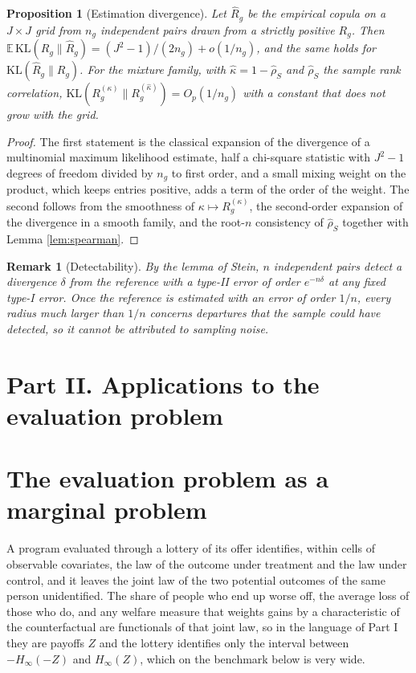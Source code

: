 \documentclass[11pt,a4paper]{article}
\theoremstyle{notesplain}
\newtheorem{proposition}[theorem]{Proposition}
\theoremstyle{notesupright}
\newtheorem{remark}[theorem]{Remark}
\numberwithin{equation}{section}
\newcommand{\KL}{\mathrm{KL}}
\newcommand{\E}{\mathbb{E}}
\begin{document}
\begin{proposition}[Estimation divergence]
\label{prop:estimation}
Let $\hat R_g$ be the empirical copula on a $J\times J$ grid from $n_g$ independent pairs drawn from a strictly positive $R_g$. Then $\E\,\KL(R_g\|\hat R_g)=(J^2-1)/(2n_g)+o(1/n_g)$, and the same holds for $\KL(\hat R_g\|R_g)$. For the mixture family, with $\hat\kappa=1-\hat\rho_S$ and $\hat\rho_S$ the sample rank correlation, $\KL(R^{(\kappa)}_g\|R^{(\hat\kappa)}_g)=O_p(1/n_g)$ with a constant that does not grow with the grid.
\end{proposition}

\begin{proof}
The first statement is the classical expansion of the divergence of a multinomial maximum likelihood estimate, half a chi-square statistic with $J^2-1$ degrees of freedom divided by $n_g$ to first order, and a small mixing weight on the product, which keeps entries positive, adds a term of the order of the weight. The second follows from the smoothness of $\kappa\mapsto R^{(\kappa)}_g$, the second-order expansion of the divergence in a smooth family, and the root-$n$ consistency of $\hat\rho_S$ together with Lemma \ref{lem:spearman}.
\end{proof}

\begin{remark}[Detectability]
By the lemma of Stein, $n$ independent pairs detect a divergence $\delta$ from the reference with a type-II error of order $e^{-n\delta}$ at any fixed type-I error. Once the reference is estimated with an error of order $1/n$, every radius much larger than $1/n$ concerns departures that the sample could have detected, so it cannot be attributed to sampling noise.
\end{remark}

\section*{Part II. Applications to the evaluation problem}

\section{The evaluation problem as a marginal problem}
\label{sec:problem}
A program evaluated through a lottery of its offer identifies, within cells of observable covariates, the law of the outcome under treatment and the law under control, and it leaves the joint law of the two potential outcomes of the same person unidentified. The share of people who end up worse off, the average loss of those who do, and any welfare measure that weights gains by a characteristic of the counterfactual are functionals of that joint law, so in the language of Part I they are payoffs $Z$ and the lottery identifies only the interval between $-H_\infty(-Z)$ and $H_\infty(Z)$, which on the benchmark below is very wide.
\end{document}
